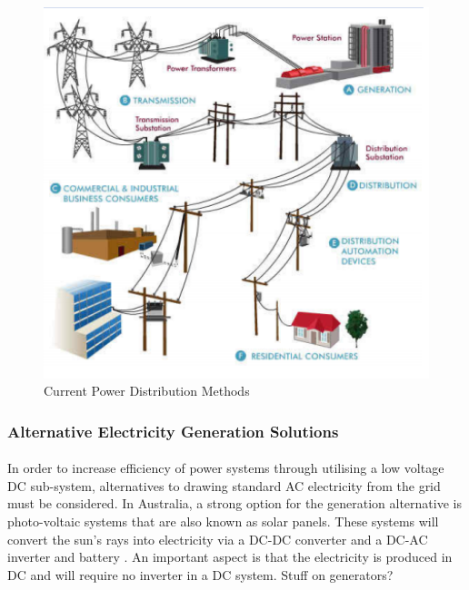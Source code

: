 \begin{figure}[H]
\hfill\includegraphics[width = 160mm]{images/Power_Distro}\hspace*{\fill}
\caption{Current Power Distribution Methods \cite{Active2015}}
\label{fig:EmergingTrends}
\end{figure}    

\subsubsection{Alternative Electricity Generation Solutions}

\paragraph{}
In order to increase efficiency of power systems through utilising a low voltage DC sub-system, alternatives to drawing standard AC electricity from the grid must be considered. In Australia, a strong option for the generation alternative is photo-voltaic systems that are also known as solar panels. These systems will convert the sun’s rays into electricity via a DC-DC converter and a DC-AC inverter and battery \cite{Pillay2004}. An important aspect is that the electricity is produced in DC and will require no inverter in a DC system.  
\newline
Stuff on generators?

